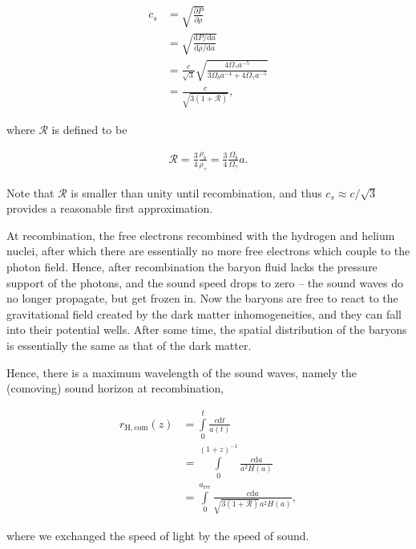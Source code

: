 \documentclass[a4paper,11pt]{article}
\begin{document}
\begin{align*}
    c_s &= \sqrt{\frac{\partial P}{\partial\rho}} \\
        &= \sqrt{\frac{\mathrm{d}P/\mathrm{d}a}{\mathrm{d}\rho/\mathrm{d}a}} \\
        &= \frac{c}{\sqrt{3}}\sqrt{\frac{4\Omega_\gamma a^{-5}}{3\Omega_ba^{-4}+4\Omega_\gamma a^{-5}}} \\
        &= \frac{c}{\sqrt{3(1+\mathcal{R})}},
\end{align*}

{\noindent}where $\mathcal{R}$ is defined to be

\begin{align*}
    \mathcal{R} = \frac{3}{4}\frac{\rho_b}{\rho_\gamma} = \frac{3}{4}\frac{\Omega_b}{\Omega_\gamma}a.
\end{align*}

{\noindent}Note that $\mathcal{R}$ is smaller than unity until recombination, and thus $c_s\approx c/\sqrt{3}$ provides a reasonable first approximation.

{\noindent}At recombination, the free electrons recombined with the hydrogen and helium nuclei, after which there are essentially no more free electrons which couple to the photon field. Hence, after recombination the baryon fluid lacks the pressure support of the photons, and the sound speed drops to zero -- the sound waves do no longer propagate, but get frozen in. Now the baryons are free to react to the gravitational field created by the dark matter inhomogeneities, and they can fall into their potential wells. After some time, the spatial distribution of the baryons is essentially the same as that of the dark matter.

{\noindent}Hence, there is a maximum wavelength of the sound waves, namely the (comoving) sound horizon at recombination,

\begin{align*}
    r_\mathrm{H,com}(z) &= \int\limits_0^t \frac{c\mathrm{d}t}{a(t)} \\ 
    &= \int\limits_0^{(1+z)^{-1}} \frac{c\mathrm{d}a}{a^2H(a)} \\
    &= \int\limits_0^{a_\mathrm{rec}} \frac{c\mathrm{d}a}{\sqrt{3(1+\mathcal{R})}a^2H(a)},
\end{align*}

{\noindent}where we exchanged the speed of light by the speed of sound.
\end{document}
